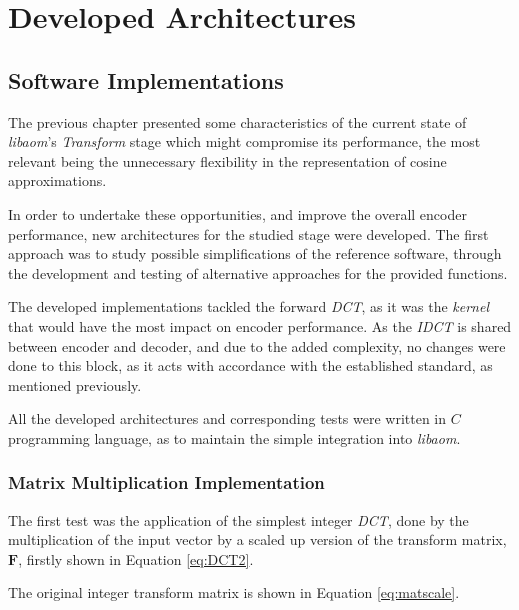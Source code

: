 \cleardoublepage
\chapter{Developed Architectures}

\section{Software Implementations}

The previous chapter presented some characteristics of the current state of \emph{libaom}'s \emph{Transform} stage which might compromise its performance, the most relevant being the unnecessary flexibility in the representation of cosine approximations.

In order to undertake these opportunities, and improve the overall encoder performance, new architectures for the studied stage were developed. The first approach was to study possible simplifications of the reference software, through the development and testing of alternative approaches for the provided functions.

The developed implementations tackled the forward \emph{DCT}, as it was the \emph{kernel} that would have the most impact on encoder performance. As the \emph{IDCT} is shared between encoder and decoder, and due to the added complexity, no changes were done to this block, as it acts with accordance with the established standard, as mentioned previously. 

All the developed architectures and corresponding tests were written in $C$ programming language, as to maintain the simple integration into \emph{libaom}.

\subsection{Matrix Multiplication Implementation}

The first test was the application of the simplest integer \emph{DCT}, done by the multiplication of the input vector by a scaled up version of the transform matrix, $\mathbf{F}$, firstly shown in Equation \ref{eq:DCT2}. 

The original integer transform matrix is shown in Equation \ref{eq:matscale}.

